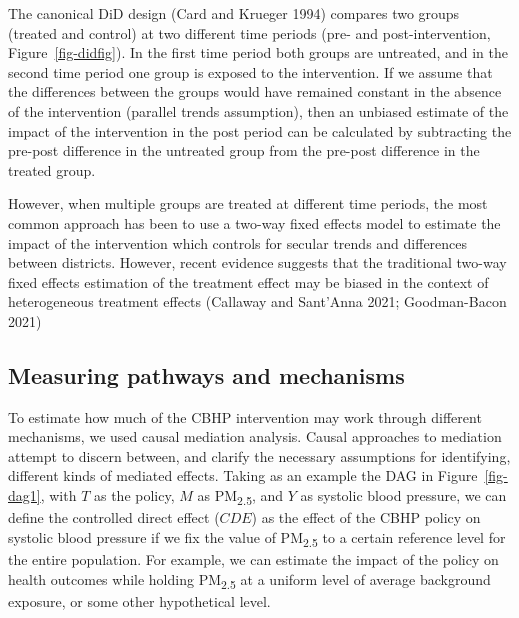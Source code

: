 \documentclass[
  letterpaper,
  DIV=11,
  numbers=noendperiod]{scrartcl}
\begin{document}
The canonical DiD design (Card and Krueger 1994) compares two groups
(treated and control) at two different time periods (pre- and
post-intervention, Figure~\ref{fig-didfig}). In the first time period
both groups are untreated, and in the second time period one group is
exposed to the intervention. If we assume that the differences between
the groups would have remained constant in the absence of the
intervention (parallel trends assumption), then an unbiased estimate of
the impact of the intervention in the post period can be calculated by
subtracting the pre-post difference in the untreated group from the
pre-post difference in the treated group.

However, when multiple groups are treated at different time periods, the
most common approach has been to use a two-way fixed effects model to
estimate the impact of the intervention which controls for secular
trends and differences between districts. However, recent evidence
suggests that the traditional two-way fixed effects estimation of the
treatment effect may be biased in the context of heterogeneous treatment
effects (Callaway and Sant'Anna 2021; Goodman-Bacon 2021)

\hypertarget{measuring-pathways-and-mechanisms}{%
\subsection{Measuring pathways and
mechanisms}\label{measuring-pathways-and-mechanisms}}

To estimate how much of the CBHP intervention may work through different
mechanisms, we used causal mediation analysis. Causal approaches to
mediation attempt to discern between, and clarify the necessary
assumptions for identifying, different kinds of mediated effects. Taking
as an example the DAG in Figure~\ref{fig-dag1}, with \(T\) as the
policy, \(M\) as PM\textsubscript{2.5}, and \(Y\) as systolic blood
pressure, we can define the controlled direct effect (\(CDE\)) as the
effect of the CBHP policy on systolic blood pressure if we fix the value
of PM\textsubscript{2.5} to a certain reference level for the entire
population. For example, we can estimate the impact of the policy on
health outcomes while holding PM\textsubscript{2.5} at a uniform level
of average background exposure, or some other hypothetical level.
\end{document}
